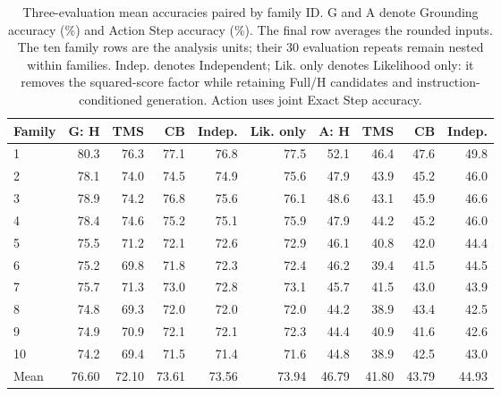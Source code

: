 \begin{table}[!tbp]
\centering
\small
\setlength{\tabcolsep}{4pt}
\renewcommand{\arraystretch}{1.13}
\renewcommand{\thetable}{C.\arabic{table}}
\renewcommand{\theHtable}{C.\arabic{table}}
\setcounter{table}{5}
\begin{adjustbox}{max width=\textwidth}
\begin{tabular}{lrrrrrrrrr}
\toprule
Family & G: H & TMS & CB & Indep. & Lik. only & A: H & TMS & CB & Indep. \\
\midrule
1 & 80.3 & 76.3 & 77.1 & 76.8 & 77.5 & 52.1 & 46.4 & 47.6 & 49.8 \\
2 & 78.1 & 74.0 & 74.5 & 74.9 & 75.6 & 47.9 & 43.9 & 45.2 & 46.0 \\
3 & 78.9 & 74.2 & 76.8 & 75.6 & 76.1 & 48.6 & 43.1 & 45.9 & 46.6 \\
4 & 78.4 & 74.6 & 75.2 & 75.1 & 75.9 & 47.9 & 44.2 & 45.2 & 46.0 \\
5 & 75.5 & 71.2 & 72.1 & 72.6 & 72.9 & 46.1 & 40.8 & 42.0 & 44.4 \\
6 & 75.2 & 69.8 & 71.8 & 72.3 & 72.4 & 46.2 & 39.4 & 41.5 & 44.5 \\
7 & 75.7 & 71.3 & 73.0 & 72.8 & 73.1 & 45.7 & 41.5 & 43.0 & 43.9 \\
8 & 74.8 & 69.3 & 72.0 & 72.0 & 72.0 & 44.2 & 38.9 & 43.4 & 42.5 \\
9 & 74.9 & 70.9 & 72.1 & 72.1 & 72.3 & 44.4 & 40.9 & 41.6 & 42.6 \\
10 & 74.2 & 69.4 & 71.5 & 71.4 & 71.6 & 44.8 & 38.9 & 42.5 & 43.0 \\
Mean & 76.60 & 72.10 & 73.61 & 73.56 & 73.94 & 46.79 & 41.80 & 43.79 & 44.93 \\
\bottomrule
\end{tabular}
\end{adjustbox}
\caption{Three-evaluation mean accuracies paired by family ID. G and A denote Grounding accuracy (\%) and Action Step accuracy (\%). The final row averages the rounded inputs. The ten family rows are the analysis units; their 30 evaluation repeats remain nested within families. Indep. denotes Independent; Lik. only denotes Likelihood only: it removes the squared-score factor while retaining Full/H candidates and instruction-conditioned generation. Action uses joint Exact Step accuracy.}
\label{tab:C.6}
\end{table}
